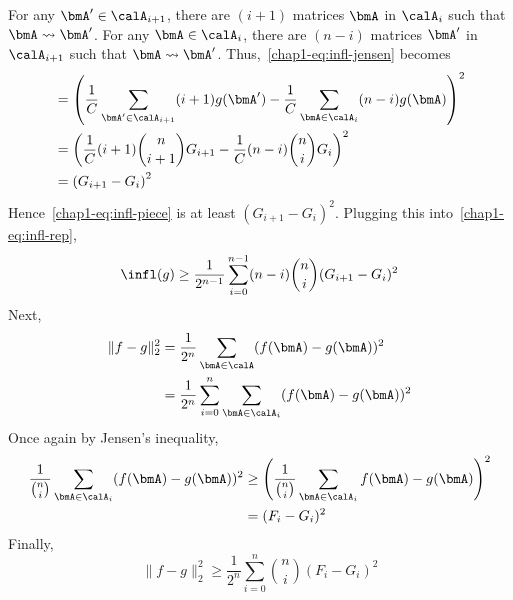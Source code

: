 For any $\bmA' \in \calA_{i+1}$, there are $(i+1)$ matrices $\bmA$ in $\calA_i$
such that $\bmA \leadsto \bmA'$.
For any $\bmA \in \calA_i$, there are $(n-i)$ matrices $\bmA'$ in $\calA_{i+1}$
such that $\bmA \leadsto \bmA'$. Thus,~\eqref{chap1-eq:infl-jensen} becomes
\begin{align*}    
    &= \left(\frac{1}{C} \sum_{\bmA' \in \calA_{i+1}} (i+1) g(\bmA') - \frac{1}{C}\sum_{\bmA \in \calA_i} (n-i) g(\bmA) \right)^2 \\
    &= \left(\frac{1}{C} (i+1) \binom{n}{i+1} G_{i+1} - \frac{1}{C} (n-i) \binom{n}{i} G_i \right)^2 \\
    &= \left(G_{i+1} - G_i \right)^2
\end{align*}
Hence~\eqref{chap1-eq:infl-piece} is at least $(G_{i+1} - G_i)^2$. Plugging this into~\eqref{chap1-eq:infl-rep},
\begin{equation}\label{chap1-eq:infl-ineq}
    \infl(g) \geq \frac{1}{2^{n-1}} \sum_{i=0}^{n-1} (n-i)\binom{n}{i} (G_{i+1} - G_i)^2
\end{equation}
Next,
\begin{align*}
    \|f-g\|_2^2 &= \frac{1}{2^n} \sum_{\bmA \in \calA} (f(\bmA) - g(\bmA))^2 \\
    &= \frac{1}{2^n} \sum_{i=0}^n \sum_{\bmA \in \calA_i} (f(\bmA) - g(\bmA))^2
\end{align*}
Once again by Jensen's inequality,
\begin{align*}
    \frac{1}{\binom{n}{i}} \sum_{\bmA \in \calA_i} (f(\bmA) - g(\bmA))^2 &\geq \left( \frac{1}{\binom{n}{i}} \sum_{\bmA \in \calA_i} f(\bmA) - g(\bmA) \right)^2 \\
    &= (F_i - G_i)^2
\end{align*}
Finally,
\begin{equation}\label{chap1-eq:bias-ineq}
    \|f-g\|_2^2 \geq  \frac{1}{2^n} \sum_{i=0}^n \binom{n}{i} (F_i - G_i)^2
\end{equation}

